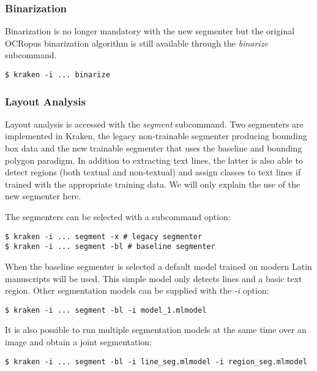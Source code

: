 \subsubsection{Binarization}

Binarization is no longer mandatory with the new segmenter but the original
OCRopus binarization algorithm is still available through the \emph{binarize}
subcommand.

\begin{verbatim}
$ kraken -i ... binarize
\end{verbatim}

\subsubsection{Layout Analysis}

Layout analysis is accessed with the \emph{segment} subcommand. Two
segmenters are implemented in Kraken, the legacy non-trainable segmenter
producing bounding box data and the new trainable segmenter that uses the
baseline and bounding polygon paradigm. In addition to extracting text lines,
the latter is also able to detect regions (both textual and non-textual) and
assign classes to text lines if trained with the appropriate training data. We
will only explain the use of the new segmenter here.

The segmenters can be selected with a subcommand option:

\begin{verbatim}
$ kraken -i ... segment -x # legacy segmenter
$ kraken -i ... segment -bl # baseline segmenter
\end{verbatim}

When the baseline segmenter is selected a default model trained on modern Latin
manuscripts will be used. This simple model only detects lines and a basic text
region. Other segmentation models can be supplied with the \emph{-i} option:

\begin{verbatim}
$ kraken -i ... segment -bl -i model_1.mlmodel
\end{verbatim}

It is also possible to run multiple segmentation models at the same time over
an image and obtain a joint segmentation:

\begin{verbatim}
$ kraken -i ... segment -bl -i line_seg.mlmodel -i region_seg.mlmodel
\end{verbatim}

